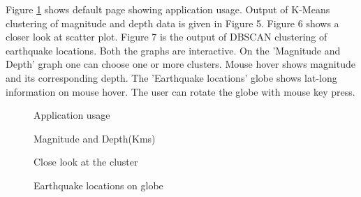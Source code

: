 \documentclass[9pt,twocolumn,twoside]{../../styles/osajnl}
\begin{document}
Figure \ref{fig:figure1} shows default page showing application usage. Output of K-Means clustering of magnitude and depth data is given in Figure 5. Figure 6 shows a closer look at scatter plot. Figure 7 is the output of DBSCAN clustering of earthquake locations. Both the graphs are interactive. On the 'Magnitude and Depth' graph one can choose one or more clusters. Mouse hover shows magnitude  and its corresponding depth. The 'Earthquake locations' globe shows lat-long information on mouse hover. The user can rotate the globe with mouse key press.


\begin{figure}[htbp]
\centering
{}
\caption{Application usage} 
\label{fig:figure1}
\end{figure}

\begin{figure}[htbp]
\centering
{}
\caption{Magnitude and Depth(Kms)} 
\label{fig:figure5}
\end{figure}


\begin{figure}[htbp]
\centering
{}
\caption{Close look at the cluster} 
\label{fig:figure6}
\end{figure}


\begin{figure}[htbp]
\centering
{}
\caption{Earthquake locations on globe} 
\label{fig:figure7}
\end{figure}
\end{document}
